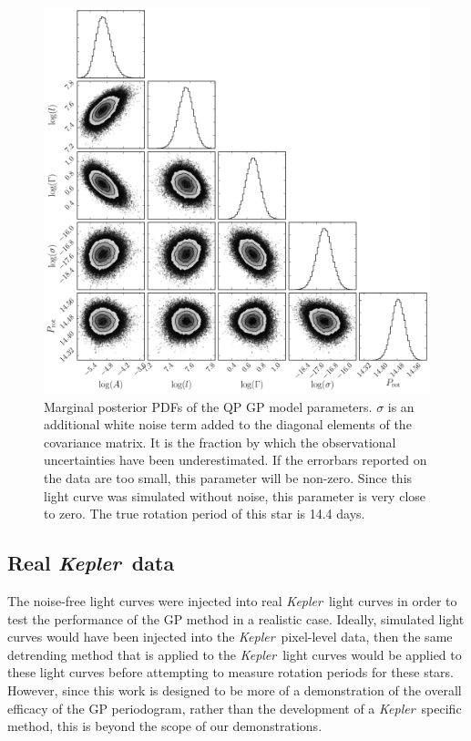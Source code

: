 \documentclass[useAMS, usenatbib, preprint, 12pt]{aastex}
\newcommand{\Kepler}{{\it Kepler}}
\newcommand{\kepler}{\Kepler}
\begin{document}
\begin{figure}
\begin{center}
\includegraphics[width=6in, clip=true]{figures/demo_triangle.pdf}
\caption{Marginal posterior PDFs of the QP GP model parameters. $\sigma$ is an
additional white noise term added to the diagonal elements of the covariance
matrix. It is the fraction by which the observational uncertainties have been
underestimated. If the errorbars reported on the data are too small, this
parameter will be non-zero. Since this light curve was simulated without
noise, this parameter is very close to zero.
The true rotation period of this star is 14.4 days.}
\label{fig:gp_posteriors}
\end{center}
\end{figure}

\subsection{Real \kepler\ data}

The noise-free light curves were injected into real \kepler\ light curves in
order to test the performance of the GP method in a realistic case.
Ideally, simulated light curves would have been injected into the \kepler\
pixel-level data, then the same detrending method that is applied to the
\kepler\ light curves would be applied to these light curves before attempting
to measure rotation periods for these stars.
However, since this work is designed to be more of a demonstration of the
overall efficacy of the GP periodogram, rather than the development of a
\Kepler\ specific method, this is beyond the scope of our demonstrations.
\end{document}
